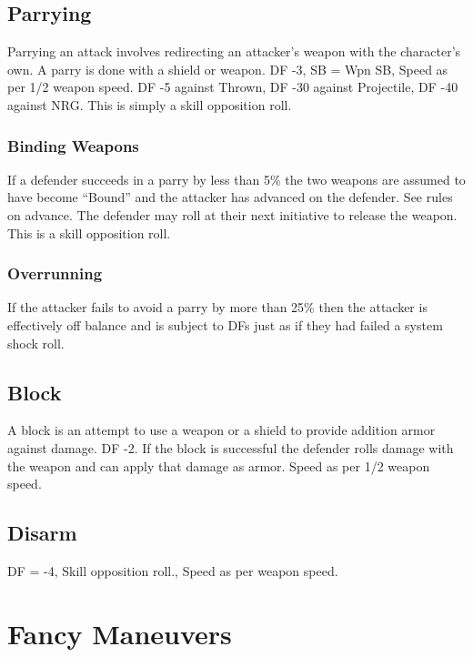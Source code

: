 \subsection{Parrying}

Parrying an attack involves redirecting an attacker's weapon with the
character's own. A parry is done with a shield or weapon. DF -3, SB = Wpn SB,
Speed as per 1/2 weapon speed. DF -5 against Thrown, DF -30 against Projectile,
DF -40 against NRG. This is simply a skill opposition roll.

\subsubsection{Binding Weapons}

If a defender succeeds in a parry by less than 5\% the two weapons are assumed
to have become ``Bound'' and the attacker has advanced on the defender. See rules
on advance. The defender may roll at their next initiative to release the weapon.
This is a skill opposition roll.

\subsubsection{Overrunning}

If the attacker fails to avoid a parry by more than 25\% then the
attacker is effectively off balance and is subject to DFs just as if
they had failed a system shock roll.

\subsection{Block}

A block is an attempt to use a weapon or a shield to provide addition
armor against damage. DF -2. If the block is successful the defender rolls
damage with the weapon and can apply that damage as armor. Speed as per
1/2 weapon speed.

\subsection{Disarm}
DF = -4, Skill opposition roll., Speed as per weapon speed.

\section{Fancy Maneuvers}

